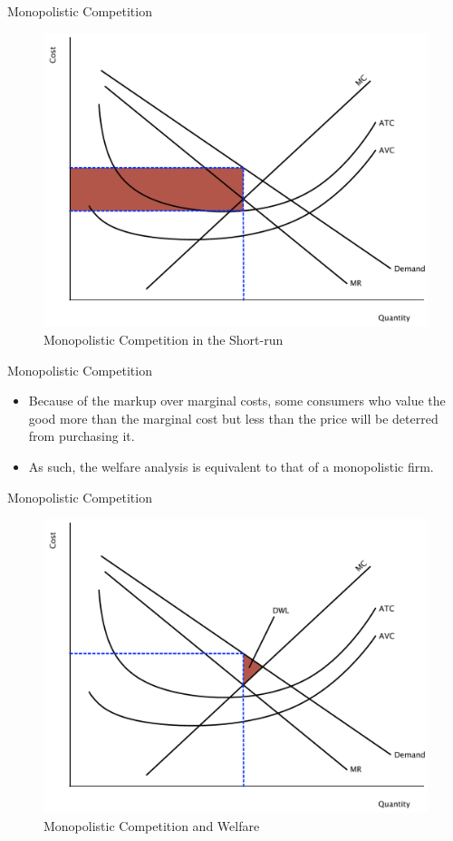 \documentclass[xcolor={dvipsnames},pdf, hyperref={colorlinks=true, citecolor=ForestGreen, linkcolor=BlueViolet, urlcolor=Magenta}, handout]{beamer}
\theoremstyle{definition}
\begin{document}
\begin{frame}{Monopolistic Competition}
		\begin{figure}[b]
		\centering
		\includegraphics[scale=.40]{plot80.pdf}
		\caption{Monopolistic Competition in the Short-run}
	\end{figure}
\end{frame}

\begin{frame}{Monopolistic Competition}
	\begin{itemize}
		\item 	Because of the markup over marginal costs, some consumers who value the good more than the marginal cost but less than the price will be deterred from purchasing it. 
		\item As such, the welfare analysis is equivalent to that of a monopolistic firm.
	\end{itemize}
\end{frame}

\begin{frame}{Monopolistic Competition}
	
	\begin{figure}[b]
		\centering
		\includegraphics[scale=.40]{plot82.pdf}
		\caption{Monopolistic Competition and Welfare}
	\end{figure}
\end{frame}
\end{document}
